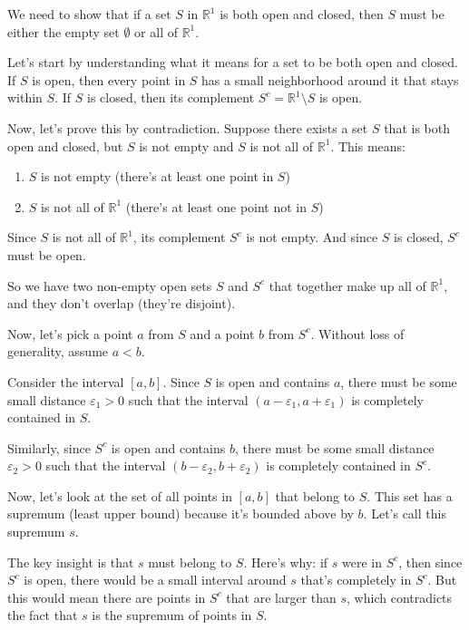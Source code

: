 We need to show that if a set $S$ in $\mathbb{R}^1$ is both open and closed, then $S$ must be either the empty set $\emptyset$ or all of $\mathbb{R}^1$.

Let's start by understanding what it means for a set to be both open and closed. If $S$ is open, then every point in $S$ has a small neighborhood around it that stays within $S$. If $S$ is closed, then its complement $S^c = \mathbb{R}^1 \setminus S$ is open.

Now, let's prove this by contradiction. Suppose there exists a set $S$ that is both open and closed, but $S$ is not empty and $S$ is not all of $\mathbb{R}^1$. This means:
\begin{enumerate}
\item $S$ is not empty (there's at least one point in $S$)
\item $S$ is not all of $\mathbb{R}^1$ (there's at least one point not in $S$)
\end{enumerate}

Since $S$ is not all of $\mathbb{R}^1$, its complement $S^c$ is not empty. And since $S$ is closed, $S^c$ must be open.

So we have two non-empty open sets $S$ and $S^c$ that together make up all of $\mathbb{R}^1$, and they don't overlap (they're disjoint).

Now, let's pick a point $a$ from $S$ and a point $b$ from $S^c$. Without loss of generality, assume $a < b$.

Consider the interval $[a, b]$. Since $S$ is open and contains $a$, there must be some small distance $\varepsilon_1 > 0$ such that the interval $(a - \varepsilon_1, a + \varepsilon_1)$ is completely contained in $S$.

Similarly, since $S^c$ is open and contains $b$, there must be some small distance $\varepsilon_2 > 0$ such that the interval $(b - \varepsilon_2, b + \varepsilon_2)$ is completely contained in $S^c$.

Now, let's look at the set of all points in $[a, b]$ that belong to $S$. This set has a supremum (least upper bound) because it's bounded above by $b$. Let's call this supremum $s$.

The key insight is that $s$ must belong to $S$. Here's why: if $s$ were in $S^c$, then since $S^c$ is open, there would be a small interval around $s$ that's completely in $S^c$. But this would mean there are points in $S^c$ that are larger than $s$, which contradicts the fact that $s$ is the supremum of points in $S$.

